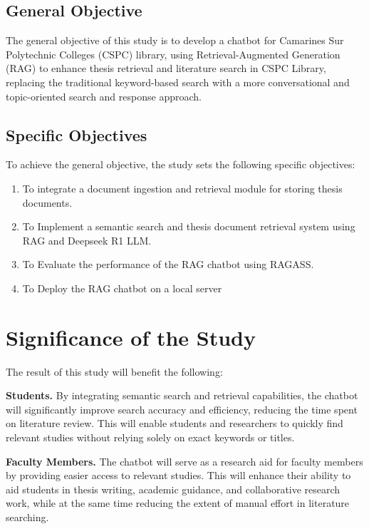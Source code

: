 \begin{refsection}
\subsection{General Objective}
The general objective of this study is to develop a chatbot for  Camarines Sur Polytechnic Colleges (CSPC) library, using Retrieval-Augmented Generation (RAG) to enhance thesis retrieval and literature search in CSPC Library, replacing the traditional keyword-based search with a more conversational and topic-oriented search and response approach.

\subsection{Specific Objectives}
To achieve the general objective, the study sets the following specific objectives:
\begin{enumerate}
    \item To integrate a document ingestion and retrieval module for storing thesis documents.
    \item To Implement a semantic search and thesis document retrieval system using RAG and Deepseek R1 LLM.
    \item To Evaluate the performance of the RAG chatbot using RAGASS.
    \item To Deploy the RAG chatbot on a local server
\end{enumerate}

   
\clearpage
\section{Significance of the Study}

The result of this study will benefit the following:

\bigbreak
\noindent \textbf{Students.}  By integrating semantic search and retrieval capabilities, the chatbot will significantly improve search accuracy and efficiency, reducing the time spent on literature review. This will enable students and researchers to quickly find relevant studies without relying solely on exact keywords or titles.

\bigbreak
\noindent \textbf{Faculty Members.}  The chatbot will serve as a research aid for faculty members by providing easier access to relevant studies. This will enhance their ability to aid students in thesis writing, academic guidance, and collaborative research work, while at the same time reducing the extent of manual effort in literature searching.


\end{refsection}
